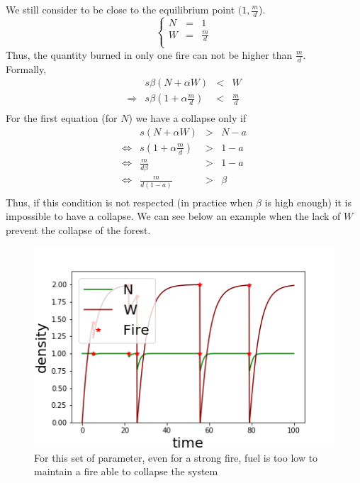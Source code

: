 \documentclass{article}
\begin{document}
We still consider to be close to the equilibrium point $(1, \frac{m}{d}$).
\[
\left\lbrace
\begin{array}{rcl}
     N & = & 1 \\
     W & = & \frac{m}{d} \\
\end{array}
\right.
\]
Thus, the quantity burned in only one fire can not be higher than $\frac{m}{d}$. \\
Formally,
\[
\begin{array}{crcl}
&s\beta(N+\alpha W) & < & W \\
\Rightarrow & s\beta(1+\alpha \frac{m}{d}) & < & \frac{m}{d} \\
\end{array}
\]
For the first equation (for $N$) we have a collapse only if
\[
\begin{array}{rccl}
                &  s(N+\alpha W) & > & N-a \\
\Leftrightarrow &  s(1+\alpha \frac{m}{d}) & > & 1-a \\ 
\Leftrightarrow &  \frac{m}{d\beta} & > & 1-a \\ 
\Leftrightarrow &  \frac{m}{d( 1-a)} & > & \beta \\ 
\end{array}
\]
Thus, if this condition is not respected (in practice when $\beta$ is high enough) it is impossible to have a collapse. We can see below  an example when the lack of $W$ prevent the collapse of the forest.

\begin{figure}[h!]
\centering
\includegraphics[width=12cm]{return_never_1.png}
\caption{For this set of parameter, even for a strong fire, fuel is too low to maintain a fire able to collapse the system}
\end{figure}
\end{document}
